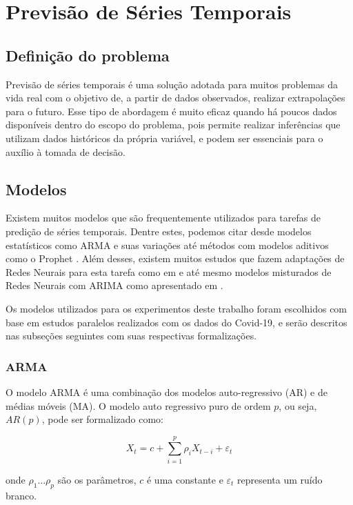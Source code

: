 \chapter{Previsão de Séries Temporais}

\section{Definição do problema}
Previsão de séries temporais é uma solução adotada para muitos problemas da vida real com o objetivo de, a partir de dados observados, realizar extrapolações para o futuro. Esse tipo de abordagem é muito eficaz quando há poucos dados disponíveis dentro do escopo do problema, pois permite realizar inferências que utilizam dados históricos da própria variável, e podem ser essenciais para o auxílio à tomada de decisão.



\section{Modelos}
Existem muitos modelos que são frequentemente utilizados para tarefas de predição de séries temporais. Dentre estes, podemos citar desde modelos estatísticos como ARMA \cite{box2015time} e suas variações \cite{ALZAHRANI2020914} até métodos com modelos aditivos como o Prophet \cite{fbprophet}. Além desses, existem muitos estudos que fazem adaptações de Redes Neurais para esta tarefa como em \cite{ZHANG2005501} e até mesmo modelos misturados de Redes Neurais com ARIMA como apresentado em \cite{ZHANG2003159}.

Os modelos utilizados para os experimentos deste trabalho foram escolhidos com base em estudos paralelos realizados com os dados do Covid-19, e serão descritos nas subseções seguintes com suas respectivas formalizações.
\subsection{ARMA}
O modelo ARMA é uma combinação dos modelos auto-regressivo (AR) e de médias móveis (MA). O modelo auto regressivo puro de ordem $p$, ou seja, $AR(p)$, pode ser formalizado como:

\[X_{t}=c+\sum ^{p}_{i=1}\rho _{i}X_{t-i}+\varepsilon _{t}\]

onde $\rho _{1}\ldots \rho _{p}$ são os parâmetros, $c$ é uma constante e $\varepsilon _{t}$ representa um ruído branco.

